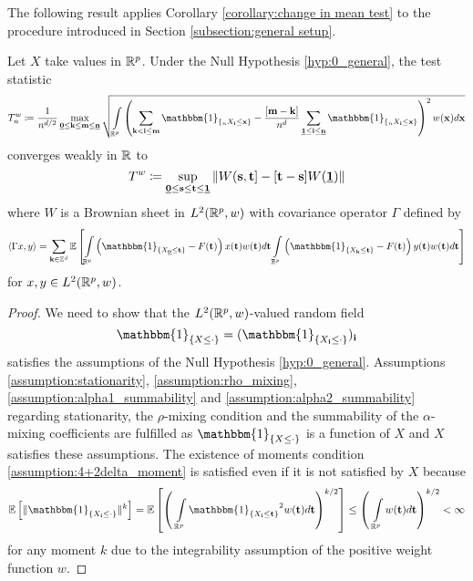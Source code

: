The following result applies Corollary \ref{corollary:change in mean test} to the procedure introduced in Section \ref{subsection:general setup}.
\begin{corollary} \label{corollary:change in distribution test}
    Let $X$ take values in $\mathbb{R}^p$. Under the Null Hypothesis \ref{hyp:0_general}, the test statistic
    \begin{equation}
        T_{n}^w \coloneqq \frac{1}{n^{d/2}} \max\limits_{\usbf[0] \leq \mathbf{k} \leq \mathbf{m} \leq \usbf[n]} \sqrt{\int\limits_{\RR^p}  \left( \sum\limits_{\mathbf{k} < \mathbf{i} \leq \mathbf{m}} \mathbbm{1}_{\{{}_{n}X_\mathbf{i} \leq \mathbf{x}\}}  - \frac{[\mathbf{m} - \mathbf{k}]}{n^d} \sum\limits_{\usbf[1] \leq \mathbf{i} \leq \usbf[n]} \mathbbm{1}_{\{{}_{n}X_\mathbf{i} \leq \mathbf{x}\}} \right)^2 w(\mathbf{x}) d\mathbf{x}  } 
    \end{equation}
    converges weakly in $\mathbb{R}$ to
    \[ T^w \coloneqq \sup\limits_{\usbf[0] \leq \mathbf{s} \leq \mathbf{t} \leq \usbf[1]} \left\| W(\mathbf{s}, \mathbf{t}] - [\mathbf{t} - \mathbf{s}] W(\usbf[1]) \right\| \]
    where $W$ is a Brownian sheet in $L^2(\mathbb{R}^p, w)$ with covariance operator $\Gamma$ defined by
    \[ \left\langle \Gamma x, y \right\rangle
    = \sum\limits_{\mathbf{k} \in \ZZ^d}
        \EE{ \int\limits_{\RR^p} \left( \mathbbm{1}_{\{ X_{\usbf[0]} \leq \mathbf{t} \}} - F(\mathbf{t}) \right) x(\mathbf{t}) w(\mathbf{t}) d\mathbf{t} \int\limits_{\RR^p} \left( \mathbbm{1}_{ \{ X_{\mathbf{k}} \leq \mathbf{t} \}} - F(\mathbf{t}) \right) y(\mathbf{t}) w(\mathbf{t}) d\mathbf{t} } \]
    for $x, y \in L^2(\mathbb{R}^p, w)$.
\end{corollary}
\begin{proof}
    We need to show that the $L^2(\mathbb{R}^p, w)$-valued random field 
    \[ \mathbbm{1}_{ \{ X \leq \cdot \}} = (\mathbbm{1}_{ \{ X_{\mathbf{i}} \leq \cdot \}})_{\mathbf{i}} \]
    satisfies the assumptions of the Null Hypothesis \ref{hyp:0_general}. Assumptions \ref{assumption:stationarity}, \ref{assumption:rho_mixing}, \ref{assumption:alpha1_summability} and \ref{assumption:alpha2_summability} regarding stationarity, the $\rho$-mixing condition and the summability of the $\alpha$-mixing coefficients are fulfilled as $\mathbbm{1}_{ \{ X \leq \cdot \}}$ is a function of $X$ and $X$ satisfies these assumptions.
    The existence of moments condition \ref{assumption:4+2delta_moment} is satisfied even if it is not satisfied by $X$ because
    \[ \EE{\| \mathbbm{1}_{ \{ X_{\mathbf{i}} \leq \cdot \}} \|^{k} } = \EE{\left( \ \int\limits_{\RR^p} {\mathbbm{1}_{ \{ X_{\mathbf{i}} \leq \mathbf{t} \}}}^2 w(\mathbf{t}) d\mathbf{t} \right)^{k/2}} \leq \left( \ \int\limits_{\RR^p} w(\mathbf{t}) d\mathbf{t} \right)^{k/2} < \infty \]
    for any moment $k$ due to the integrability assumption of the positive weight function $w$.
\end{proof}


